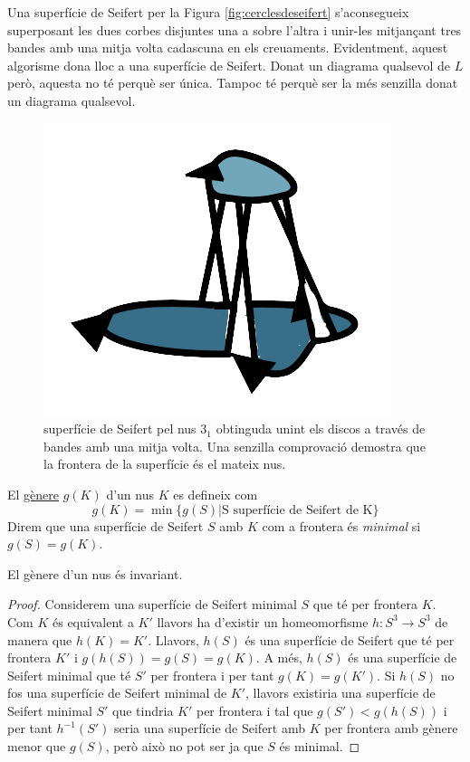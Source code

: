 Una superfície de Seifert per la Figura \ref{fig:cerclesdeseifert} s'aconsegueix superposant les dues corbes disjuntes una a sobre l'altra i unir-les mitjançant tres bandes amb una mitja volta cadascuna en els creuaments. Evidentment, aquest algorisme dona lloc a una superfície de Seifert. Donat un diagrama qualsevol de $L$ però, aquesta no té perquè ser única. Tampoc té perquè ser la més senzilla donat un diagrama qualsevol.

\begin{figure}
	\centering
	\includegraphics[width=0.6\linewidth]{img/superficiedeseifert.png}
	\caption{superfície de Seifert pel nus $3_1$ obtinguda unint els discos a través de bandes amb una mitja volta. Una senzilla comprovació demostra que la frontera de la superfície és el mateix nus.}\label{fig:superficiedeseifert2}
\end{figure}

\begin{definition}\label{def:genere}
	El \underline{gènere} $g(K)$ d'un nus $K$ es defineix com $$g(K)=\min\{g(S)| \text{S superfície de Seifert de K}\}$$ Direm que una superfície de Seifert $S$ amb $K$ com a frontera és \textit{minimal} si $g(S)=g(K)$.
\end{definition}

\begin{proposition}
	El gènere d'un nus és invariant.
\end{proposition}

\begin{proof}
	Considerem una superfície de Seifert minimal $S$ que té per frontera $K$. Com $K$ és equivalent a $K'$ llavors ha d'existir un homeomorfisme $h:S^3\rightarrow S^3$ de manera que $h(K)=K'$. Llavors, $h(S)$ és una superfície de Seifert que té per frontera $K'$ i $g(h(S))=g(S)=g(K)$. A més, $h(S)$ és una superfície de Seifert minimal que té $S'$ per frontera i per tant $g(K)=g(K')$. Si $h(S)$ no fos una superfície de Seifert minimal de $K'$, llavors existiria una superfície de Seifert minimal $S'$ que tindria $K'$ per frontera i tal que $g(S')<g(h(S))$ i per tant $h^{-1}(S')$ seria una superfície de Seifert amb $K$ per frontera amb gènere menor que $g(S)$, però això no pot ser ja que $S$ és minimal.
\end{proof}

